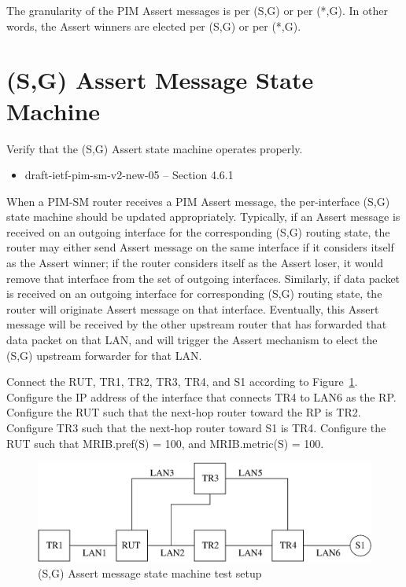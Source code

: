 \documentclass[11pt]{report}
\begin{document}
The granularity of the PIM Assert messages is per (S,G) or per (*,G).
In other words, the Assert winners are elected per (S,G) or per (*,G).


\newpage
\section{(S,G) Assert Message State Machine}

Verify that the (S,G) Assert state machine operates properly.

\begin{itemize}
  \item draft-ietf-pim-sm-v2-new-05 -- Section 4.6.1
\end{itemize}

When a PIM-SM router receives a PIM Assert message, the per-interface
(S,G) state machine should be updated appropriately. Typically, if an
Assert message is received on an outgoing interface for the corresponding
(S,G) routing state, the router may either send Assert message on the
same interface if it considers itself as the Assert winner; if the router
considers itself as the Assert loser, it would remove that interface from the
set of outgoing interfaces. Similarly, if data packet is received on an
outgoing interface for corresponding (S,G) routing state, the router will
originate Assert message on that interface. Eventually, this Assert message
will be received by the other upstream router that has forwarded that data
packet on that LAN, and will trigger the Assert mechanism to elect the (S,G)
upstream forwarder for that LAN.

Connect the RUT, TR1, TR2, TR3, TR4, and S1 according to
Figure~\ref{fig:pim_test_5_1_sg_assert_message_state_machine}.
Configure the IP address of the interface that connects TR4 to LAN6 as the RP.
Configure the RUT such that the next-hop router toward the RP is TR2.
Configure TR3 such that the next-hop router toward S1 is TR4.
Configure the RUT such that MRIB.pref(S) = 100, and MRIB.metric(S) = 100.

\begin{figure}[htbp]
  \begin{center}
    \includegraphics[scale=0.8]{figs/pim_test_5_1_sg_assert_message_state_machine}
    \caption{(S,G) Assert message state machine test setup}
    \label{fig:pim_test_5_1_sg_assert_message_state_machine}
  \end{center}
\end{figure}
\end{document}
